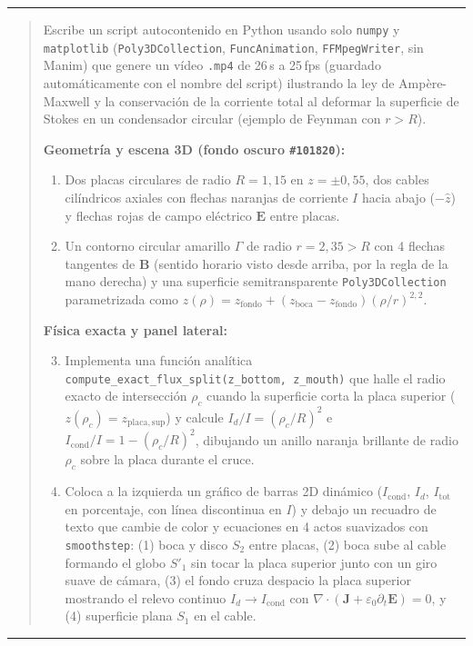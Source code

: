 \documentclass[11pt]{article}
\begin{document}
\noindent\color{mutedgray}\rule{\linewidth}{0.5pt}\color{black}
\begin{quote}
{\sloppy Escribe un script autocontenido en Python usando solo \texttt{numpy} y \texttt{matplotlib} (\texttt{Poly3DCollection}, \texttt{FuncAnimation}, \texttt{FFMpegWriter}, sin Manim) que genere un vídeo \texttt{.mp4} de 26\,s a 25\,fps (guardado automáticamente con el nombre del script) ilustrando la ley de Ampère-Maxwell y la conservación de la corriente total al deformar la superficie de Stokes en un condensador circular (ejemplo de Feynman con $r > R$).\par}

\textbf{Geometría y escena 3D (fondo oscuro \texttt{\#101820}):}
\begin{enumerate}
    \item Dos placas circulares de radio $R = 1{,}15$ en $z = \pm 0{,}55$, dos cables cilíndricos axiales con flechas naranjas de corriente $I$ hacia abajo ($-\hat{z}$) y flechas rojas de campo eléctrico $\mathbf{E}$ entre placas.
    \item Un contorno circular amarillo $\Gamma$ de radio $r = 2{,}35 > R$ con 4 flechas tangentes de $\mathbf{B}$ (sentido horario visto desde arriba, por la regla de la mano derecha) y una superficie semitransparente \texttt{Poly3DCollection} parametrizada como $z(\rho) = z_{\mathrm{fondo}} + (z_{\mathrm{boca}} - z_{\mathrm{fondo}})(\rho/r)^{2{,}2}$.
\end{enumerate}

\textbf{Física exacta y panel lateral:}
\begin{enumerate}
    \setcounter{enumi}{2}
    \item Implementa una función analítica \texttt{compute\_exact\_flux\_split(z\_bottom, z\_mouth)} que halle el radio exacto de intersección $\rho_c$ cuando la superficie corta la placa superior ($z(\rho_c) = z_{\mathrm{placa,sup}}$) y calcule $I_d/I = (\rho_c/R)^2$ e $I_{\mathrm{cond}}/I = 1 - (\rho_c/R)^2$, dibujando un anillo naranja brillante de radio $\rho_c$ sobre la placa durante el cruce.
    \item Coloca a la izquierda un gráfico de barras 2D dinámico ($I_{\mathrm{cond}}$, $I_d$, $I_{\mathrm{tot}}$ en porcentaje, con línea discontinua en $I$) y debajo un recuadro de texto que cambie de color y ecuaciones en 4 actos suavizados con \texttt{smoothstep}: (1) boca y disco $S_2$ entre placas, (2) boca sube al cable formando el globo $S'_1$ sin tocar la placa superior junto con un giro suave de cámara, (3) el fondo cruza despacio la placa superior mostrando el relevo continuo $I_d \to I_{\mathrm{cond}}$ con $\nabla\cdot(\mathbf{J} + \varepsilon_0 \partial_t\mathbf{E}) = 0$, y (4) superficie plana $S_1$ en el cable.
\end{enumerate}
\end{quote}
\noindent\color{mutedgray}\rule{\linewidth}{0.5pt}\color{black}
\end{document}
